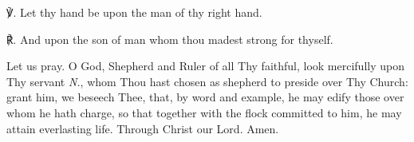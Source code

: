 \begin{enpars}℣. Let thy hand be upon the man of thy right hand.

℟. And upon the son of man whom thou madest strong for thyself.

Let us pray. O God, Shepherd and Ruler of all Thy faithful, look mercifully upon Thy servant  \textit{N.}, whom Thou hast chosen as shepherd to preside over Thy Church: grant him, we beseech Thee, that, by word and example, he may edify those over whom he hath charge, so that together with the flock committed to him, he may attain everlasting life. Through Christ our Lord. Amen.

\end{enpars}